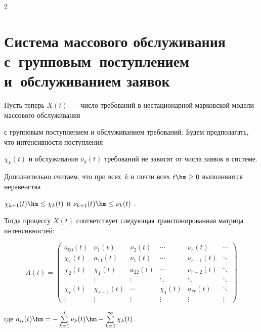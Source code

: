 \begin{multicols}{2}
\section{Система массового обслуживания с~групповым~поступлением и~обслуживанием заявок}



Пусть теперь  $X(t)$~--- число требований в нестационарной марковской модели массового обслуживания

с групповым поступлением и обслуживанием требований. Будем предполагать, что интенсивности поступления

 $\chi_{k}(t)$ и обслуживания $\nu_{k}(t)$  требований не зависят от чис\-ла заявок в системе.

 Дополнительно считаем, что при всех~$k$ и почти всех  $t \hm\ge 0$  выполняются неравенства

 $\chi_{k+1}(t)\hm \le \chi_{k}(t)$ и $\nu_{k+1}(t)\hm \le \nu_{k}(t)$ .

Тогда процессу $X(t)$ соответствует следующая транспонированная матрица интенсивностей:



\noindent

{%

\begin{equation*}

A(t)=\begin{pmatrix}

a_{00}(t) & \nu_1(t)  & \nu_2(t)   &   \cdots & \nu_r(t) & \cdots\\[3pt]

\chi_1(t)   & a_{11}(t)  & \nu_1(t)  &  \cdots & \nu_{r-1}(t) & \ddots\\[3pt]

\chi_2(t)  & \chi_1(t)    & a_{22}(t)&   \cdots & \nu_{r-2}(t) & \ddots\\[3pt]

\vdots&\vdots&\vdots&\ddots&\ddots&\ddots\\[3pt]

\chi_r(t) & \chi_{r-1}(t) & \cdots &  \chi_1 (t)   &  a_{rr}(t) & \ddots\\[3pt]

\vdots&\vdots&\vdots&\vdots&\vdots&\vdots

\end{pmatrix}


\end{equation*}}

где $a_{ii}(t)\hm=-\sum\limits_{k=1}^{i}\nu_k(t) \hm- \sum\limits_{k=1}^{\infty} \chi_{k}(t)$.




\end{multicols}
